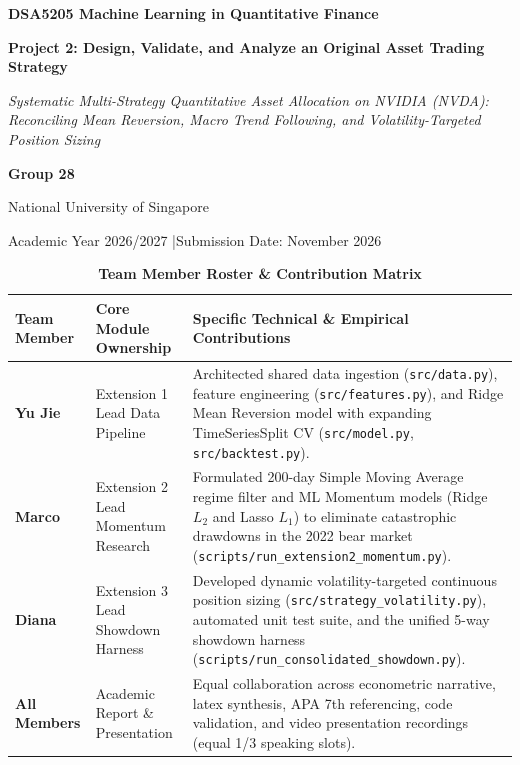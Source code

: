 \documentclass[12pt, a4paper]{article}
\begin{document}
\begin{titlepage}
    \centering
    \vspace*{0.3in}
    {\LARGE\bfseries DSA5205 Machine Learning in Quantitative Finance\par}
    \vspace{0.3in}
    {\huge\bfseries Project 2: Design, Validate, and Analyze an Original Asset Trading Strategy\par}
    \vspace{0.2in}
    {\Large\itshape Systematic Multi-Strategy Quantitative Asset Allocation on NVIDIA (NVDA):\\
    Reconciling Mean Reversion, Macro Trend Following, and Volatility-Targeted Position Sizing\par}
    \vspace{0.4in}
    {\Large \textbf{Group 28}\par}
    \vspace{0.1in}
    {\large National University of Singapore\par}
    \vspace{0.1in}
    {\large Academic Year 2026/2027 \quad|\quad Submission Date: November 2026\par}
    \vspace{0.3in}

    \begin{table}[H]
    \centering
    \small
    \caption*{\textbf{Team Member Roster \& Contribution Matrix}}
    \begin{tabular}{p{3.2cm} p{3.0cm} p{8.5cm}}
    \toprule
    \textbf{Team Member} & \textbf{Core Module Ownership} & \textbf{Specific Technical \& Empirical Contributions} \\
    \midrule
    \textbf{Yu Jie} & Extension 1 Lead \newline Data Pipeline & Architected shared data ingestion (\texttt{src/data.py}), feature engineering (\texttt{src/features.py}), and Ridge Mean Reversion model with expanding TimeSeriesSplit CV (\texttt{src/model.py}, \texttt{src/backtest.py}). \\
    \midrule
    \textbf{Marco} & Extension 2 Lead \newline Momentum Research & Formulated 200-day Simple Moving Average regime filter and ML Momentum models (Ridge $L_2$ and Lasso $L_1$) to eliminate catastrophic drawdowns in the 2022 bear market (\texttt{scripts/run\_extension2\_momentum.py}). \\
    \midrule
    \textbf{Diana} & Extension 3 Lead \newline Showdown Harness & Developed dynamic volatility-targeted continuous position sizing (\texttt{src/strategy\_volatility.py}), automated unit test suite, and the unified 5-way showdown harness (\texttt{scripts/run\_consolidated\_showdown.py}). \\
    \midrule
    \textbf{All Members} & Academic Report \& Presentation & Equal collaboration across econometric narrative, latex synthesis, APA 7th referencing, code validation, and video presentation recordings (equal 1/3 speaking slots). \\
    \bottomrule
    \end{tabular}
    \end{table}


\end{titlepage}
\end{document}
